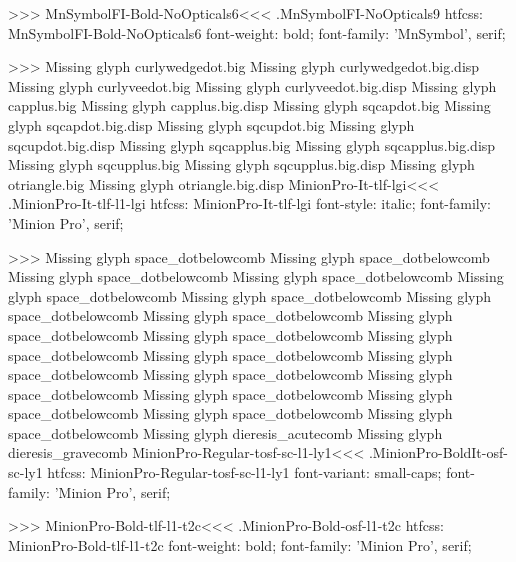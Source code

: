 {{>>>
\<MnSymbolFI-Bold-NoOpticals6\><<<
.MnSymbolFI-NoOpticals9
htfcss:  MnSymbolFI-Bold-NoOpticals6  font-weight: bold; font-family: 'MnSymbol', serif;

>>>
Missing glyph	curlywedgedot.big
Missing glyph	curlywedgedot.big.disp
Missing glyph	curlyveedot.big
Missing glyph	curlyveedot.big.disp
Missing glyph	capplus.big
Missing glyph	capplus.big.disp
Missing glyph	sqcapdot.big
Missing glyph	sqcapdot.big.disp
Missing glyph	sqcupdot.big
Missing glyph	sqcupdot.big.disp
Missing glyph	sqcapplus.big
Missing glyph	sqcapplus.big.disp
Missing glyph	sqcupplus.big
Missing glyph	sqcupplus.big.disp
Missing glyph	otriangle.big
Missing glyph	otriangle.big.disp
\<MinionPro-It-tlf-lgi\><<<
.MinionPro-It-tlf-l1-lgi
htfcss:  MinionPro-It-tlf-lgi  font-style: italic; font-family: 'Minion Pro', serif;

>>>
Missing glyph	space_dotbelowcomb
Missing glyph	space_dotbelowcomb
Missing glyph	space_dotbelowcomb
Missing glyph	space_dotbelowcomb
Missing glyph	space_dotbelowcomb
Missing glyph	space_dotbelowcomb
Missing glyph	space_dotbelowcomb
Missing glyph	space_dotbelowcomb
Missing glyph	space_dotbelowcomb
Missing glyph	space_dotbelowcomb
Missing glyph	space_dotbelowcomb
Missing glyph	space_dotbelowcomb
Missing glyph	space_dotbelowcomb
Missing glyph	space_dotbelowcomb
Missing glyph	space_dotbelowcomb
Missing glyph	space_dotbelowcomb
Missing glyph	space_dotbelowcomb
Missing glyph	space_dotbelowcomb
Missing glyph	space_dotbelowcomb
Missing glyph	dieresis_acutecomb
Missing glyph	dieresis_gravecomb
\<MinionPro-Regular-tosf-sc-l1-ly1\><<<
.MinionPro-BoldIt-osf-sc-ly1
htfcss:  MinionPro-Regular-tosf-sc-l1-ly1  font-variant: small-caps; font-family: 'Minion Pro', serif;

>>>
\<MinionPro-Bold-tlf-l1-t2c\><<<
.MinionPro-Bold-osf-l1-t2c
htfcss:  MinionPro-Bold-tlf-l1-t2c  font-weight: bold; font-family: 'Minion Pro', serif;

}}
